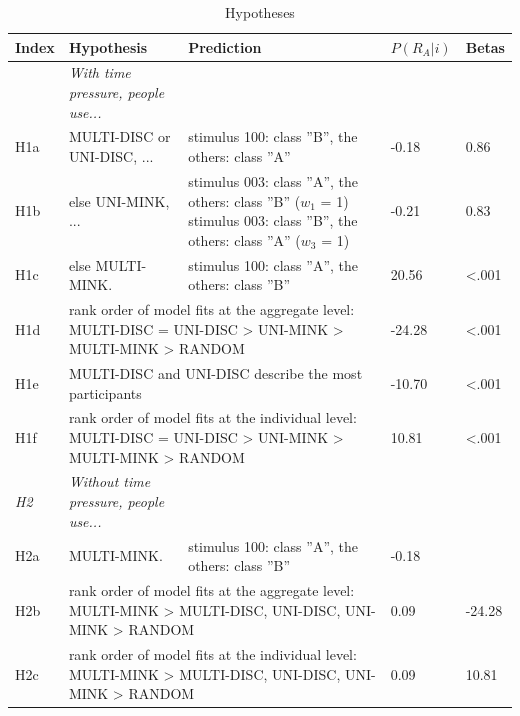 \documentclass[a4paper,man,natbib]{apa6}
\begin{document}
\begin{table}
\begin{center}
\begin{threeparttable}
\caption{Hypotheses}
\label{tab:hypotheses}
\begin{tabular*}{\textwidth}{lp{55mm}p{100mm}ll}
\toprule
\multicolumn{1}{l}{Index} & \multicolumn{1}{l}{Hypothesis} & \multicolumn{1}{l}{Prediction} & \multicolumn{1}{l}{$P(R_{A}|i)$} & \multicolumn{1}{l}{Betas}\\
\midrule
\addlinespace
\multicolumn{1}{l}{\emph{H1}} & \multicolumn{1}{l}{\emph{With time pressure, people use...}} \\
\addlinespace
H1a & MULTI-DISC or UNI-DISC, ... & stimulus 100: class ''B'', the others: class ''A'' & -0.18 & 0.86\\
\addlinespace
H1b & else UNI-MINK, ...  & stimulus 003: class ''A'', the others: class ''B'' ($w_1$ = 1) \newline stimulus 003: class ''B'', the others: class ''A'' ($w_3$ = 1) & -0.21 & 0.83\\
\addlinespace
H1c & else MULTI-MINK. & stimulus 100: class ''A'', the others: class ''B'' & 20.56 & <.001\\
\addlinespace
H1d & \multicolumn{2}{p{135mm}}{rank order of model fits at the aggregate level: \newline MULTI-DISC = UNI-DISC > UNI-MINK > MULTI-MINK > RANDOM} & -24.28 & <.001\\
\addlinespace
H1e & \multicolumn{2}{l}{MULTI-DISC and UNI-DISC describe the most participants} & -10.70 & <.001\\
\addlinespace
H1f & \multicolumn{2}{p{135mm}}{rank order of model fits at the individual level: \newline MULTI-DISC = UNI-DISC > UNI-MINK > MULTI-MINK > RANDOM} & 10.81 & <.001\\
\midrule
\multicolumn{1}{l}{\emph{H2}} & \multicolumn{1}{l}{\emph{Without time pressure, people use...}} \\
\addlinespace
H2a & MULTI-MINK. & stimulus 100: class ''A'', the others: class ''B'' & -0.18\\
\addlinespace
H2b & \multicolumn{2}{p{150mm}}{rank order of model fits at the aggregate level: \newline MULTI-MINK > {MULTI-DISC, UNI-DISC, UNI-MINK} > RANDOM} & 0.09 & -24.28\\
\addlinespace
H2c & \multicolumn{2}{p{150mm}}{rank order of model fits at the individual level: \newline MULTI-MINK > {MULTI-DISC, UNI-DISC, UNI-MINK} > RANDOM} & 0.09 & 10.81 \\

\end{tabular*}
\end{threeparttable}
\end{center}
\end{table}
\end{document}
